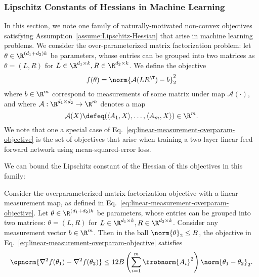  \subsubsection{Lipschitz Constants of Hessians in Machine Learning}\label{ssec:ML-lipschitz-Hessians}

 In this section, we note one family of naturally-motivated non-convex objectives satisfying Assumption~\ref{assume:Lipschitz-Hessian} that arise in machine learning problems. We consider the over-parameterized matrix factorization problem: let $\theta \in \R^{(d_1+d_2)k}$ be parameters, whose entries can be grouped into two matrices as $\theta = (L,R)$ for $L\in \R^{d_1\times k}, R\in \R^{d_2\times k}$. We define the objective 
\begin{equation}\label{eq:linear-measurement-overparam-objective}
    f(\theta) = \norm{\mathcal{A}(LR^\T) - b}^2_2
\end{equation}
where $b \in \R^m$ correspond to measurements of some matrix under map $\mathcal{A}(\cdot)$, and where  $\mathcal{A}:\R^{d_1\times d_2}\rightarrow \R^m$ denotes a map 
\[
    \mathcal{A}(X) \defeq (\langle A_1, X\rangle, \dots, \langle A_m, X\rangle) \in \R^m.
\]
We note that one a special case of Eq.~\ref{eq:linear-measurement-overparam-objective} is the set of objectives that arise when training a two-layer linear feed-forward network using mean-squared-error loss.

We can bound the Lipschitz constant of the Hessian of this objectives in this family:
\begin{lemma}\label{lemma:overparam-linear-measurement-Lipschitz-Hessian}
    Consider the overparameterized matrix factorization objective with a linear measurement map, as defined in Eq.~\ref{eq:linear-measurement-overparam-objective}. Let $\theta \in \R^{(d_1+d_2)k}$ be parameters, whose entries can be grouped into two matrices: $\theta = (L,R)$ for $L\in \R^{d_1\times k}, R\in \R^{d_2\times k}$. Consider any measurement vector $b \in \R^{m}$. Then in the ball $\norm{\theta}_2 \leq B$, the objective in Eq.~\ref{eq:linear-measurement-overparam-objective} satisfies
     \[
        \opnorm{\nabla^2 f(\theta_1)-\nabla^2 f(\theta_2)} \leq 12 B \left(\sum_{i=1}^m \frobnorm{A_i}^2 \right)\norm{\theta_1 - \theta_2}_2.
     \]
\end{lemma}

